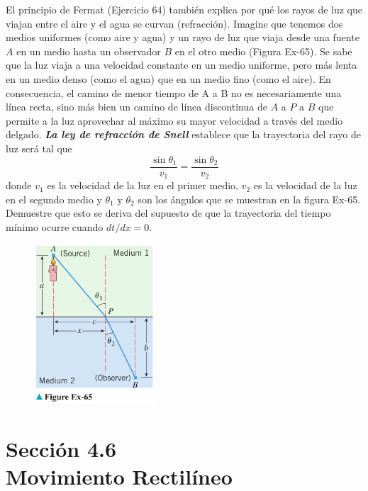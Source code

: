 \documentclass[12pt]{article}
\begin{document}
El principio de Fermat (Ejercicio 64) también explica por qué los rayos de luz que viajan entre el aire y el agua se curvan (refracción). Imagine que tenemos dos medios uniformes (como aire y agua) y un rayo de luz que viaja desde una fuente $A$ en un medio hasta un observador $B$ en el otro medio (Figura Ex-65). Se sabe que la luz viaja a una velocidad constante en un medio uniforme, pero más lenta en un medio denso (como el agua) que en un medio fino (como el aire). En consecuencia, el camino de menor tiempo de A a B no es necesariamente una línea recta, sino más bien un camino de línea discontinua de $A$ a $P$ a $B$ que permite a la luz aprovechar al máximo su mayor velocidad a través del medio delgado. \textit{\textbf{La ley de refracción de Snell}} establece que la trayectoria del rayo de luz será tal que
\[
\frac{\sin{\theta_1}}{v_1}=\frac{\sin{\theta_2}}{v_2}
\]
donde $v_1$ es la velocidad de la luz en el primer medio, $v_2$ es la velocidad de la luz en el segundo medio y $\theta_1$ y $\theta_2$ son los ángulos que se muestran en la figura Ex-65. Demuestre que esto se deriva del supuesto de que la trayectoria del tiempo mínimo ocurre cuando $dt /dx = 0$.
\begin{figure}[H]
\centering
\includegraphics[width=0.4\textwidth]{../img/img_Lista3/3_65.png}
\end{figure}

\section{Sección 4.6 \\ Movimiento Rectilíneo}
\end{document}
